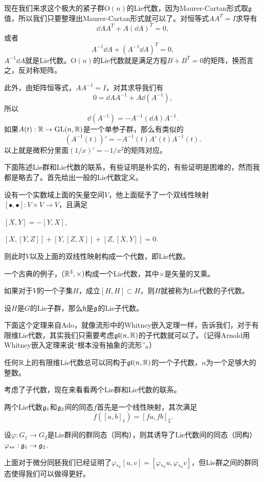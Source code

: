 现在我们来求这个极大的紧子群$\mathrm{O}(n)$的Lie代数，因为Maurer-Cartan形式取${\mathfrak{g}}$值，所以我们只要整理出Maurer-Cartan形式就可以了。对恒等式$AA^T=I$求导有
\[
	\dd A A^T+A(\dd A)^T=0,
\]
或者
\[
	A^{-1}\dd A+(A^{-1}\dd A)^T=0,
\]
$A^{-1}\dd A$就是Lie代数。$\mathrm{O}(n)$的Lie代数就是满足方程$B+B^T=0$的矩阵，换而言之，反对称矩阵。

此外，由矩阵恒等式，$AA^{-1}=I$，对其求导我们有
\[
0=\dd A A^{-1}+A\dd(A^{-1}),
\]
所以
\[
\dd(A^{-1})=-A^{-1}(\dd A) A^{-1}.
\]
如果$A(t):\mathbb{R} \to \mathrm{GL}(n,\mathbb{R})$是一个单参子群，那么有类似的
\[
(A^{-1}(t))'=-A^{-1}(t)A'(t) A^{-1}(t).
\]
以上就是微积分里面$(1/x)'=-1/x^2$的矩阵对应。

下面陈述Lie群和Lie代数的联系，有些证明是朴实的，有些证明是困难的，然而我都是略去了。首先给出一般的Lie代数定义。

\para
设有一个实数域上面的矢量空间$V$，他上面赋予了一个双线性映射$[\bullet,\bullet]:V\times V\to V$，且满足

 $[X,Y]=-[Y,X]$,

 $[X,[Y,Z]]+[Y,[Z,X]]+[Z,[X,Y]]=0$.

则此时$V$以及上面的双线性映射构成一个代数，即Lie代数。


一个古典的例子，$(\mathbb{R}^3,\times)$构成一个Lie代数，其中$\times$是矢量的叉乘。


\para
如果对于$V$的一个子集$H$，成立$[H,H]\subset H$，则$H$就被称为Lie代数的子代数。

\begin{theo}
设$H$是$G$的Lie子群，那么$\mathfrak{h}$是${\mathfrak{g}}$的Lie子代数。
\end{theo}
下面这个定理来自Ado，就像流形中的Whitney嵌入定理一样，告诉我们，对于有限维Lie代数，其实我们只需要考虑$\mathfrak{gl}(n,\mathbb{R})$的子代数就可以了。（记得Arnold用Whitney嵌入定理来说“根本没有抽象的流形”。）
\begin{theo}
任何$\mathbb{R}$上的有限维Lie代数总可以同构于$\mathfrak{gl}(n,\mathbb{R})$的一个子代数，$n$为一个足够大的整数。
\end{theo}

考虑了子代数，现在来看看两个Lie群和Lie代数的联系。

\para
两个Lie代数${\mathfrak{g}}_1$和${\mathfrak{g}}_2$间的同态$f$首先是一个线性映射，其次满足
\[
f([a,b]_1)=[fa,fb]_2.
\]

\begin{theo}
设$\varphi:G_1\to G_2$是Lie群间的群同态（同构），则其诱导了Lie代数间的同态（同构）$\varphi_{*e}:{\mathfrak{g}}_1\to {\mathfrak{g}}_2$.
\end{theo}
上面对于微分同胚我们已经证明了$\varphi_{*e}[u,v]=[\varphi_{*e}u,\varphi_{*e}v]$，但Lie群之间的群同态使得我们可以做得更好。

